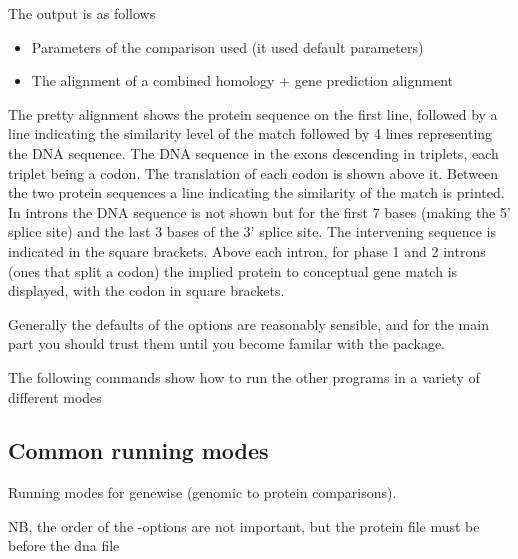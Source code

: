 \documentclass{article}
\begin{document}
The output is as follows
\begin{itemize}
\item Parameters of the comparison used (it used default parameters)
\item The alignment of a combined homology + gene prediction alignment
\end{itemize}

The pretty alignment shows the protein sequence on the first line,
followed by a line indicating the similarity level of the match
followed by 4 lines representing the DNA sequence. The DNA sequence in
the exons descending in triplets, each triplet being a codon. The
translation of each codon is shown above it. Between the two protein
sequences a line indicating the similarity of the match is printed. In
introns the DNA sequence is not shown but for the first 7 bases
(making the 5' splice site) and the last 3 bases of the 3' splice
site. The intervening sequence is indicated in the square
brackets. Above each intron, for phase 1 and 2 introns (ones that
split a codon) the implied protein to conceptual gene match is
displayed, with the codon in square brackets.

Generally the defaults of the options are reasonably sensible, and for
the main part you should trust them until you become familar with the package.

The following commands show how to run the other programs in a variety
of different modes

\subsection{Common running modes}
\label{sec:commonmode}
Running modes for genewise (genomic to protein comparisons).

NB, the order of the -options are not important, but the protein file must be
before the dna file
\end{document}
